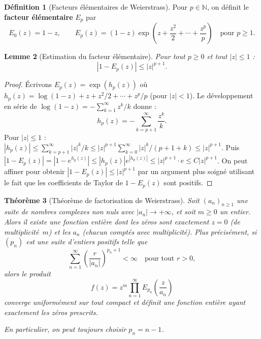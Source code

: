 \documentclass[12pt,a4paper,openany]{book}
\theoremstyle{definition}
\newtheorem{definition}{Définition}[chapter]
\theoremstyle{plain}
\newtheorem{theoreme}[definition]{Théorème}
\newtheorem{lemme}[definition]{Lemme}
\theoremstyle{remark}
\newcommand{\N}{\mathbb{N}}
\newcommand{\abs}[1]{\left|#1\right|}
\begin{document}
\begin{definition}[Facteurs élémentaires de Weierstrass]\label{def:facteurs-elementaires}
Pour $p \in \N$, on définit le \textbf{facteur élémentaire} $E_p$ par
\[
  E_0(z) = 1 - z, \qquad
  E_p(z) = (1 - z) \exp\!\left(z + \frac{z^2}{2} + \cdots + \frac{z^p}{p}\right)
  \quad \text{pour } p \geq 1.
\]
\end{definition}

\begin{lemme}[Estimation du facteur élémentaire]\label{lem:estimation-Ep}
Pour tout $p \geq 0$ et tout $\abs{z} \leq 1$ :
\[
  \abs{1 - E_p(z)} \leq \abs{z}^{p+1}.
\]
\end{lemme}

\begin{proof}
Écrivons $E_p(z) = \exp(h_p(z))$ où
$h_p(z) = \log(1-z) + z + z^2/2 + \cdots + z^p/p$ (pour $\abs{z} < 1$).
Le développement en série de $\log(1-z) = -\sum_{k=1}^{\infty} z^k/k$ donne :
\[
  h_p(z) = -\sum_{k=p+1}^{\infty} \frac{z^k}{k}.
\]
Pour $\abs{z} \leq 1$ : $\abs{h_p(z)} \leq \sum_{k=p+1}^{\infty} \abs{z}^k/k
\leq \abs{z}^{p+1} \sum_{k=0}^{\infty} \abs{z}^k/(p+1+k) \leq \abs{z}^{p+1}$.
Puis $\abs{1 - E_p(z)} = \abs{1 - e^{h_p(z)}} \leq \abs{h_p(z)} e^{\abs{h_p(z)}}
\leq \abs{z}^{p+1} \cdot e \leq C\abs{z}^{p+1}$.
On peut affiner pour obtenir $\abs{1 - E_p(z)} \leq \abs{z}^{p+1}$ par un
argument plus soigné utilisant le fait que les coefficients de Taylor de
$1 - E_p(z)$ sont positifs.
\end{proof}

\begin{theoreme}[Théorème de factorisation de Weierstrass]\label{thm:weierstrass}
Soit $(a_n)_{n \geq 1}$ une suite de nombres complexes non nuls avec
$\abs{a_n} \to +\infty$, et soit $m \geq 0$ un entier. Alors il existe une
fonction entière dont les zéros sont exactement $z = 0$ (de multiplicité~$m$)
et les $a_n$ (chacun comptés avec multiplicité). Plus précisément, si $(p_n)$
est une suite d'entiers positifs telle que
\[
  \sum_{n=1}^{\infty} \left(\frac{r}{\abs{a_n}}\right)^{p_n+1} < \infty
  \quad \text{pour tout } r > 0,
\]
alors le produit
\[
  f(z) = z^m \prod_{n=1}^{\infty} E_{p_n}\!\left(\frac{z}{a_n}\right)
\]
converge uniformément sur tout compact et définit une fonction entière ayant
exactement les zéros prescrits.

En particulier, on peut toujours choisir $p_n = n - 1$.
\end{theoreme}
\end{document}
